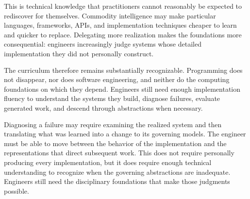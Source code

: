 
This is technical knowledge that practitioners cannot reasonably be expected to rediscover for themselves. Commodity intelligence may make particular languages, frameworks, APIs, and implementation techniques cheaper to learn and quicker to replace. Delegating more realization makes the foundations more consequential: engineers increasingly judge systems whose detailed implementation they did not personally construct.


The curriculum therefore remains substantially recognizable. Programming does not disappear, nor does software engineering, and neither do the computing foundations on which they depend. Engineers still need enough implementation fluency to understand the systems they build, diagnose failures, evaluate generated work, and descend through abstractions when necessary.


Diagnosing a failure may require examining the realized system and then translating what was learned into a change to its governing models. The engineer must be able to move between the behavior of the implementation and the representations that direct subsequent work. This does not require personally producing every implementation, but it does require enough technical understanding to recognize when the governing abstractions are inadequate. Engineers still need the disciplinary foundations that make those judgments possible.


